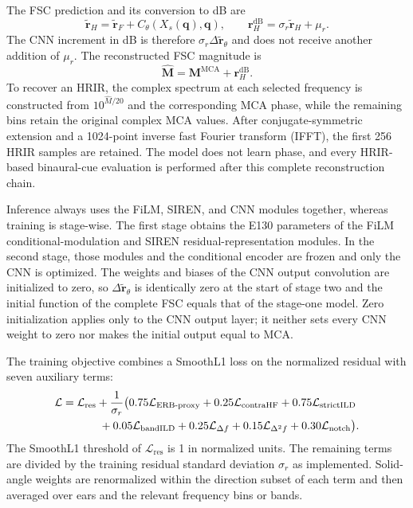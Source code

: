 \documentclass[UTF8,a4paper]{article}
\begin{document}
The FSC prediction and its conversion to dB are
\begin{equation}
\widetilde{\mathbf r}_H=\widetilde{\mathbf r}_F+
C_\theta(X_s(\mathbf q),\mathbf q),\qquad
\mathbf r_H^{\mathrm{dB}}=\sigma_r\widetilde{\mathbf r}_H+\mu_r.
\end{equation}
The CNN increment in dB is therefore $\sigma_r\Delta\widetilde{\mathbf r}_\theta$ and does not receive another addition of $\mu_r$. The reconstructed FSC magnitude is
\begin{equation}
\widehat{\mathbf M}=\mathbf M^{\mathrm{MCA}}+
\mathbf r_H^{\mathrm{dB}}.
\end{equation}
To recover an HRIR, the complex spectrum at each selected frequency is constructed from $10^{\widehat M/20}$ and the corresponding MCA phase, while the remaining bins retain the original complex MCA values. After conjugate-symmetric extension and a 1024-point inverse fast Fourier transform (IFFT), the first 256 HRIR samples are retained. The model does not learn phase, and every HRIR-based binaural-cue evaluation is performed after this complete reconstruction chain.

Inference always uses the FiLM, SIREN, and CNN modules together, whereas training is stage-wise. The first stage obtains the E130 parameters of the FiLM conditional-modulation and SIREN residual-representation modules. In the second stage, those modules and the conditional encoder are frozen and only the CNN is optimized. The weights and biases of the CNN output convolution are initialized to zero, so $\Delta\widetilde{\mathbf r}_\theta$ is identically zero at the start of stage two and the initial function of the complete FSC equals that of the stage-one model. Zero initialization applies only to the CNN output layer; it neither sets every CNN weight to zero nor makes the initial output equal to MCA.

The training objective combines a SmoothL1 loss on the normalized residual with seven auxiliary terms:
\begin{align}
\mathcal L={}&\mathcal L_{\mathrm{res}}+
\frac{1}{\sigma_r}\big(
0.75\mathcal L_{\mathrm{ERB\text{-}proxy}}+
0.25\mathcal L_{\mathrm{contraHF}}+
0.75\mathcal L_{\mathrm{strictILD}}\notag\\
&\qquad+
0.05\mathcal L_{\mathrm{bandILD}}+
0.25\mathcal L_{\Delta f}+
0.15\mathcal L_{\Delta^2 f}+
0.30\mathcal L_{\mathrm{notch}}\big).
\label{eq:training-loss}
\end{align}
The SmoothL1 threshold of $\mathcal L_{\mathrm{res}}$ is 1 in normalized units. The remaining terms are divided by the training residual standard deviation $\sigma_r$ as implemented. Solid-angle weights are renormalized within the direction subset of each term and then averaged over ears and the relevant frequency bins or bands.
\end{document}
